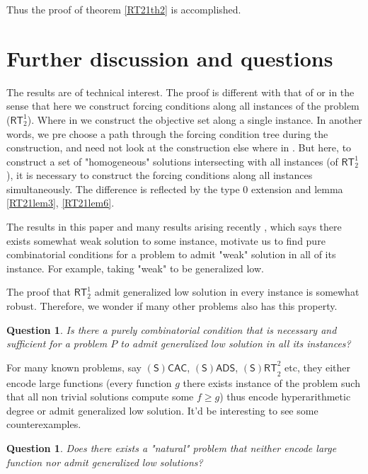 \documentclass[options]{amsart}
\newtheorem {question}[theorem]{Question}
\theoremstyle{definition}
\theoremstyle{remark}
\newtheorem{Ramsey's theorem}[theorem]{Ramsey's theorem}
\begin{document}
Thus the proof of theorem
\ref{RT21th2} is accomplished.

\section{Further discussion and questions}
\label{RT21secfurther}
The results are of technical interest.
The proof is different with that of
\cite{liu2015cone}
or \cite{Dzhafarov2009} in the sense that here we
construct forcing conditions
along all instances of the problem ($\mathsf{RT}_2^1$).
Where in \cite{liu2015cone} we construct the objective
set along a single instance. In another words,
we pre choose a path through the forcing condition
tree during the construction, and need not look
at the construction else where in
\cite{liu2015cone}. But here, to construct
a set of "homogeneous"
solutions intersecting with
all instances (of $\mathsf{RT}_2^1$),
it is necessary to construct the
forcing conditions along all instances simultaneously.
The difference is reflected by the type
0 extension and lemma \ref{RT21lem3},
\ref{RT21lem6}.

The results in this paper and
many results arising recently \cite{lerman2013separating}
\cite{patey2015iterative}
\cite{wangdefinability},
which says there exists somewhat weak
solution to some instance,
motivate us to find pure combinatorial
conditions for a problem to
admit "weak" solution in all of its
instance. For example, taking
"weak" to be generalized low.

The proof that $\mathsf{RT}_2^1$ admit
generalized low solution in every
instance is somewhat robust. Therefore,
we wonder if many other problems also
has this property.

\begin{question}
Is there a purely combinatorial
condition  that is
necessary and sufficient
for a problem $P$ to admit
generalized low solution in
all its instances?

\end{question}

For many known 
problems, say $\mathsf{(S)CAC}$,
$\mathsf{(S)ADS}$,
$\mathsf{(S)RT}_2^2$ etc, they either
encode large functions
(every function $g$ there exists
instance of the problem such that 
all non trivial solutions compute
some $f\geq g$)  thus
encode hyperarithmetic degree or 
admit generalized low solution.
It'd be interesting to see
some counterexamples.
\begin{question}
Does there exists a "natural"
problem that neither 
encode large function
nor admit generalized low
solutions?
\end{question}



\end{document}
